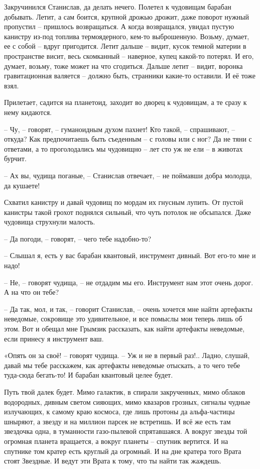 \documentclass[ebook,oneside,final,openright]{memoir}
\begin{document}
\par
Закручинился Станислав, да делать нечего. Полетел к чудовищам барабан добывать. Летит, а сам боится, крупной дрожью дрожит, даже поворот нужный пропустил – пришлось возвращаться. А когда возвращался, увидал пустую канистру из-под топлива термоядерного, кем-то выброшенную. Возьму, думает, ее с собой – вдруг пригодится. Летит дальше – видит, кусок темной материи в пространстве висит, весь скомканный – наверное, купец какой-то потерял. И его, думает, возьму, тоже может на что сгодиться. Дальше летит – видит, воронка гравитационная валяется – должно быть, странники какие-то оставили. И её тоже взял.\par
\par
Прилетает, садится на планетоид, заходит во дворец к чудовищам, а те сразу к нему кидаются. \par
– Чу, – говорят, – гуманоидным духом пахнет! Кто такой, – спрашивают, – откуда? Как предпочитаешь быть съеденным – с головы или с ног? Да не тяни с ответами, а то проголодались мы чудовищно – лет сто уж не ели – в животах бурчит.\par
– Ах вы, чудища поганые, – Станислав отвечает, – не поймавши добра молодца, да кушаете! \par
Схватил канистру и давай чудовищ по мордам их гнусным лупить. От пустой канистры такой грохот поднялся сильный, что чуть потолок не обсыпался. Даже чудовища струхнули малость. \par
– Да погоди, – говорят, – чего тебе надобно-то?\par
– Слышал я, есть у вас барабан квантовый, инструмент дивный. Вот его-то мне и надо!\par
– Не, – говорят чудища, – не отдадим мы его. Инструмент нам этот очень дорог. А на что он тебе? \par
– Да так, мол, и так, – говорит Станислав, – очень хочется мне найти артефакты неведомые, сокровище это удивительное, и все помыслы мои теперь лишь об этом. Вот и обещал мне Грымзик рассказать, как найти артефакты неведомые, если принесу я инструмент ваш. \par
\par
«Опять он за своё! – говорят чудища. – Уж и не в первый раз!.. Ладно, слушай, давай мы тебе расскажем, как артефакты неведомые отыскать, а то чего тебе туда-сюда бегать-то! И барабан квантовый целее будет. \par
\par
Путь твой далек будет. Мимо галактик, в спирали закрученных, мимо облаков водородных, дивным светом сияющих, мимо квазаров грозных, сигналы чудные излучающих, к самому краю космоса, где лишь протоны да альфа-частицы шныряют, а звезду и на миллион парсек не встретишь. И всё же есть там звездочка одна, в туманности газо-пылевой спрятавшаяся. А вокруг звезды той огромная планета вращается, а вокруг планеты – спутник вертится. И на спутнике том кратер есть круглый да огромный. И на дне кратера того Врата стоят Звездные. И ведут эти Врата к тому, что ты найти так жаждешь.\par
\end{document}

